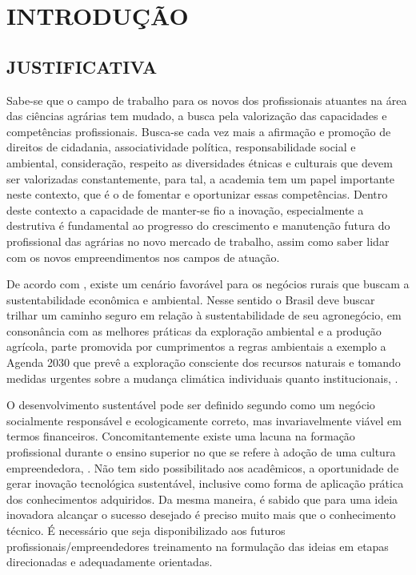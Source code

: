 \chapter{INTRODUÇÃO}

\section{JUSTIFICATIVA}

Sabe-se que o campo de trabalho para os novos dos profissionais atuantes na área das ciências agrárias tem mudado, a busca pela valorização das capacidades e competências profissionais. Busca-se cada vez mais a afirmação e promoção de direitos de cidadania, associatividade política, responsabilidade social e ambiental, consideração, respeito as diversidades étnicas e culturais que devem ser valorizadas constantemente, para tal, a academia  tem um papel importante neste contexto, que é  o de fomentar e oportunizar essas competências. Dentro deste contexto a capacidade de manter-se fio a inovação, especialmente a destrutiva é fundamental ao progresso do crescimento e manutenção futura do profissional das agrárias no novo mercado de trabalho, assim como saber lidar com os novos empreendimentos nos campos de atuação.

De acordo com , existe um cenário favorável para os negócios rurais que buscam a sustentabilidade econômica e ambiental. Nesse sentido o Brasil deve buscar trilhar  um caminho seguro em relação à sustentabilidade de seu agronegócio, em consonância com as melhores práticas da exploração ambiental e a produção agrícola, parte promovida por cumprimentos a regras ambientais a exemplo a Agenda 2030 que prevê a exploração consciente dos recursos naturais e tomando medidas urgentes sobre a mudança climática individuais quanto institucionais, \cite{filho_documentos_2017}.

O desenvolvimento sustentável pode ser definido segundo \cite{lara_ideologia_2017} como um negócio socialmente responsável e ecologicamente correto, mas invariavelmente viável em termos financeiros. Concomitantemente existe uma lacuna na formação profissional durante o ensino superior no que se refere à adoção de uma cultura empreendedora, \cite{lima_ser_2015}. Não tem sido possibilitado aos acadêmicos, a oportunidade de gerar inovação tecnológica sustentável, inclusive como forma de aplicação prática dos conhecimentos adquiridos. Da mesma maneira, é sabido que para uma ideia inovadora alcançar o sucesso desejado é preciso muito mais que o conhecimento técnico. É necessário que seja disponibilizado aos futuros profissionais/empreendedores treinamento na formulação das ideias em etapas direcionadas e adequadamente orientadas.

